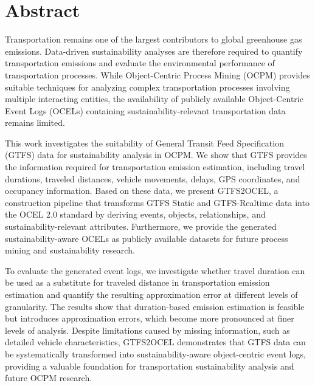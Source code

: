 \chapter*{Abstract}

Transportation remains one of the largest contributors to global greenhouse gas emissions. Data-driven sustainability analyses are therefore required to quantify transportation emissions and evaluate the environmental performance of transportation processes. While Object-Centric Process Mining (OCPM) provides suitable techniques for analyzing complex transportation processes involving multiple interacting entities, the availability of publicly available Object-Centric Event Logs (OCELs) containing sustainability-relevant transportation data remains limited.

This work investigates the suitability of General Transit Feed Specification (GTFS) data for sustainability analysis in OCPM. We show that GTFS provides the information required for transportation emission estimation, including travel durations, traveled distances, vehicle movements, delays, GPS coordinates, and occupancy information. Based on these data, we present GTFS2OCEL, a construction pipeline that transforms GTFS Static and GTFS-Realtime data into the OCEL 2.0 standard by deriving events, objects, relationships, and sustainability-relevant attributes. Furthermore, we provide the generated sustainability-aware OCELs as publicly available datasets for future process mining and sustainability research.

To evaluate the generated event logs, we investigate whether travel duration can be used as a substitute for traveled distance in transportation emission estimation and quantify the resulting approximation error at different levels of granularity. The results show that duration-based emission estimation is feasible but introduces approximation errors, which become more pronounced at finer levels of analysis. Despite limitations caused by missing information, such as detailed vehicle characteristics, GTFS2OCEL demonstrates that GTFS data can be systematically transformed into sustainability-aware object-centric event logs, providing a valuable foundation for transportation sustainability analysis and future OCPM research.
